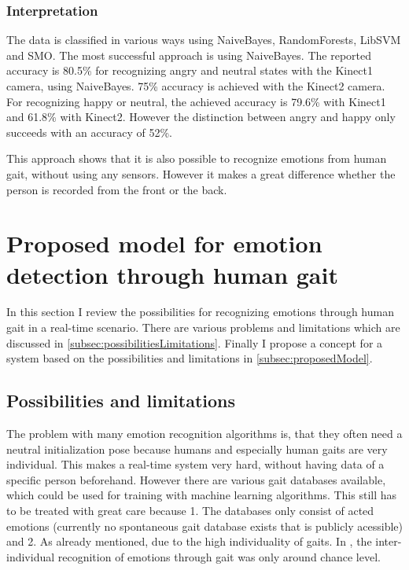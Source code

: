 \documentclass[conference]{IEEEtran}
\begin{document}
\subsubsection{Interpretation}
The data is classified in various ways using NaiveBayes, RandomForests, LibSVM and SMO\cite{li2016emotion}. The most successful approach is using NaiveBayes.  
The reported accuracy is 80.5\% for recognizing angry and neutral states with the Kinect1 camera, using NaiveBayes. 75\% accuracy is achieved with the Kinect2 camera.
For recognizing happy or neutral, the achieved accuracy is 79.6\% with Kinect1 and 61.8\% with Kinect2. However the distinction between angry and happy only succeeds with an accuracy of 52\%.

This approach shows that it is also possible to recognize emotions from human gait, without using any sensors. However it makes a great difference whether the person is recorded from the front or the back.


\section{Proposed model for emotion detection through human gait}
\label{sec:proposal}
In this section I review the possibilities for recognizing emotions through human gait in a real-time scenario. There are various problems and limitations which are discussed in \autoref{subsec:possibilitiesLimitations}. Finally I propose a concept for a system based on the possibilities and limitations in \autoref{subsec:proposedModel}.

\subsection{Possibilities and limitations}
\label{subsec:possibilitiesLimitations}
The problem with many emotion recognition algorithms is, that they often need a neutral initialization pose\cite{li2016emotion,cui2016emotion} because humans and especially human gaits are very individual. This makes a real-time system very hard, without having data of a specific person beforehand. However there are various gait databases available\cite{wang2008recognizing,karg2009comparison}, which could be used for training with machine learning algorithms. This still has to be treated with great care because 1. The databases only consist of acted emotions (currently no spontaneous gait database exists that is publicly acessible) and 2. As already mentioned, due to the high individuality of gaits\cite{karg2012pattern,janssen2008recognition}. In \cite{janssen2008recognition}, the inter-individual recognition of emotions through gait was only around chance level.
\end{document}
